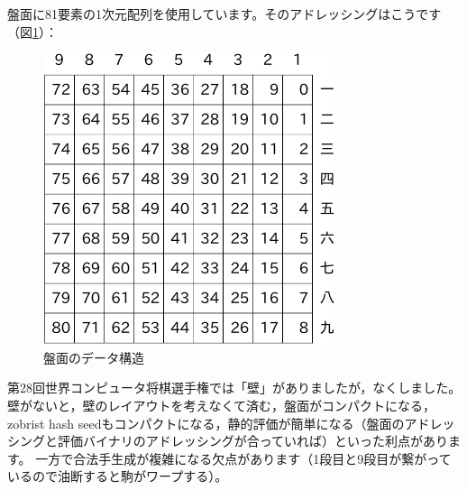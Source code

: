 \documentclass[11pt,a4paper]{ltjsarticle}
\begin{document}
盤面に81要素の1次元配列を使用しています。そのアドレッシングはこうです（図\ref{fig1}）：
\begin{figure}[h]
  \centering
  \includegraphics{fig/fig1.pdf}
  \caption{盤面のデータ構造}
  \label{fig1}
\end{figure}

第28回世界コンピュータ将棋選手権では「壁」がありましたが，なくしました。
壁がないと，壁のレイアウトを考えなくて済む，盤面がコンパクトになる，zobrist hash seedもコンパクトになる，静的評価が簡単になる（盤面のアドレッシングと評価バイナリのアドレッシングが合っていれば）といった利点があります。
一方で合法手生成が複雑になる欠点があります（1段目と9段目が繋がっているので油断すると駒がワープする）。
\end{document}

